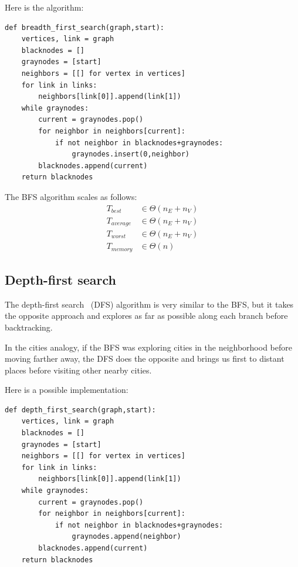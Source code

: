 \documentclass[justified,sixbynine]{tufte-book}
\def\ft{\small\tt}
\theoremstyle{plain}%
\theoremstyle{definition}
\theoremstyle{remark}
\begin{document}
\begin{fullwidth}
Here is the algorithm:

\begin{lstlisting}[caption={in file: {\ft nlib.py}}]
def breadth_first_search(graph,start):
    vertices, link = graph
    blacknodes = []
    graynodes = [start]
    neighbors = [[] for vertex in vertices]
    for link in links:
        neighbors[link[0]].append(link[1])
    while graynodes:
        current = graynodes.pop()
        for neighbor in neighbors[current]:
            if not neighbor in blacknodes+graynodes:
                graynodes.insert(0,neighbor)
        blacknodes.append(current)
    return blacknodes
\end{lstlisting}

The BFS algorithm scales as follows:
\begin{align}
T_{best} &\in \Theta (n_E+n_V) \\
T_{average} &\in \Theta (n_E+n_V) \\
T_{worst} &\in \Theta (n_E+n_V) \\
T_{memory} &\in \Theta (n)
\end{align}

\subsection{Depth-first search}


The depth-first search~\cite{dfs} (DFS) algorithm is very similar to the BFS, but it takes the opposite approach and explores as far as possible along each branch before backtracking.

In the cities analogy, if the BFS was exploring cities in the neighborhood before moving farther away, the DFS does the opposite and brings us first to distant places before visiting other nearby cities.

Here is a possible implementation:

\begin{lstlisting}[caption={in file: {\ft nlib.py}}]
def depth_first_search(graph,start):
    vertices, link = graph
    blacknodes = []
    graynodes = [start]
    neighbors = [[] for vertex in vertices]
    for link in links:
        neighbors[link[0]].append(link[1])
    while graynodes:
        current = graynodes.pop()
        for neighbor in neighbors[current]:
            if not neighbor in blacknodes+graynodes:
                graynodes.append(neighbor)
        blacknodes.append(current)
    return blacknodes
\end{lstlisting}


\end{fullwidth}
\end{document}
